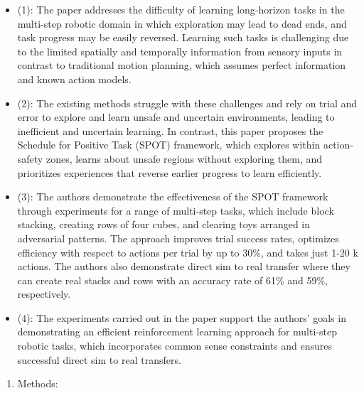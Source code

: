 \begin{itemize}
\item
  (1): The paper addresses the difficulty of learning long-horizon tasks
  in the multi-step robotic domain in which exploration may lead to dead
  ends, and task progress may be easily reversed. Learning such tasks is
  challenging due to the limited spatially and temporally information
  from sensory inputs in contrast to traditional motion planning, which
  assumes perfect information and known action models.
\item
  (2): The existing methods struggle with these challenges and rely on
  trial and error to explore and learn unsafe and uncertain
  environments, leading to inefficient and uncertain learning. In
  contrast, this paper proposes the Schedule for Positive Task (SPOT)
  framework, which explores within action-safety zones, learns about
  unsafe regions without exploring them, and prioritizes experiences
  that reverse earlier progress to learn efficiently.
\item
  (3): The authors demonstrate the effectiveness of the SPOT framework
  through experiments for a range of multi-step tasks, which include
  block stacking, creating rows of four cubes, and clearing toys
  arranged in adversarial patterns. The approach improves trial success
  rates, optimizes efficiency with respect to actions per trial by up to
  30\%, and takes just 1-20 k actions. The authors also demonstrate
  direct sim to real transfer where they can create real stacks and rows
  with an accuracy rate of 61\% and 59\%, respectively.
\item
  (4): The experiments carried out in the paper support the authors'
  goals in demonstrating an efficient reinforcement learning approach
  for multi-step robotic tasks, which incorporates common sense
  constraints and ensures successful direct sim to real transfers.
\end{itemize}

\begin{enumerate}
\def\labelenumi{\arabic{enumi}.}
\setcounter{enumi}{6}
\tightlist
\item
  Methods:
\end{enumerate}

